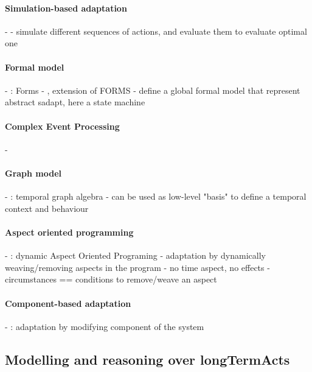 \paragraph{Simulation-based adaptation}
- \cite{DBLP:conf/smartgridsec/0001FKNT14}
	- simulate different sequences of actions, and evaluate them to evaluate optimal one

\paragraph{Formal model}
- \cite{DBLP:journals/taas/WeynsMA12}: Forms
- \cite{DBLP:conf/icse/IftikharW14a}, extension of FORMS
	- define a global formal model that represent abstract \gls{sadapt}, here a state machine


\paragraph{Complex Event Processing}
- \cite{DBLP:conf/rr/AnicicFRSSS10}

\paragraph{Graph model}
- \cite{DBLP:conf/dbpl/MoffittS17}: temporal graph algebra
	- can be used as low-level "basis" to define a temporal context and behaviour
	
\paragraph{Aspect oriented programming}
- \cite{DBLP:journals/taosd/GreenwoodB06, DBLP:conf/soco/DavidL06, DBLP:conf/icws/CharfiDM09, DBLP:conf/icws/CharfiDM09, DBLP:journals/scp/ParraBCD11, DBLP:conf/ewsa/FalcarinA04}: dynamic Aspect Oriented Programing
	- adaptation by dynamically weaving/removing aspects in the program
	- no time aspect, no effects
	- circumstances == conditions to remove/weave an aspect

\paragraph{Component-based adaptation}
- \cite{DBLP:conf/soco/DavidL06}: adaptation by modifying component of the system


	


\subsection[Modelling and reasoning over long-term actions]{Modelling and reasoning over \glspl{longTermAct}}